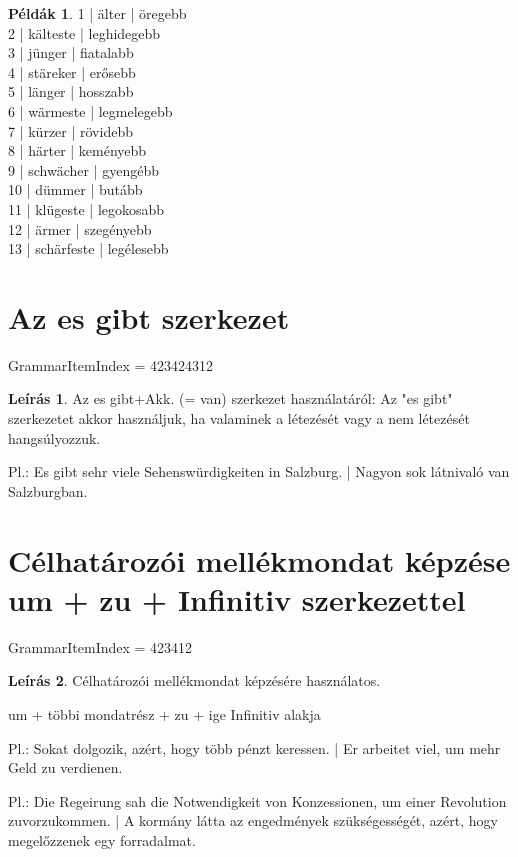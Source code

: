 \documentclass{article}
\theoremstyle{definition}
\newtheorem*{exmp}{Példák}
\newtheorem*{desc}{Leírás}
\begin{document}
\begin{exmp}
1 | älter | öregebb\\
2 | kälteste | leghidegebb\\
3 | jünger | fiatalabb\\
4 | stäreker | erősebb\\
5 | länger | hosszabb\\
6 | wärmeste | legmelegebb\\
7 | kürzer | rövidebb\\
8 | härter | keményebb\\
9 | schwächer | gyengébb\\
10 | dümmer | butább\\
11 | klügeste | legokosabb\\
12 | ärmer | szegényebb\\
13 | schärfeste | legélesebb\\
\end{exmp}

\section{Az es gibt szerkezet}

GrammarItemIndex = 423424312

\begin{desc}
Az es gibt+Akk. (= van) szerkezet használatáról: Az "es gibt" szerkezetet akkor használjuk, ha valaminek a létezését vagy a nem létezését hangsúlyozzuk.

Pl.: Es gibt sehr viele Sehenswürdigkeiten in Salzburg. | Nagyon sok látnivaló van Salzburgban.
\end{desc}

\section{Célhatározói mellékmondat képzése um + zu + Infinitiv szerkezettel}

GrammarItemIndex = 423412

\begin{desc}
Célhatározói mellékmondat képzésére használatos.

um + többi mondatrész + zu + ige Infinitiv alakja

Pl.: Sokat dolgozik, azért, hogy több pénzt keressen. | Er arbeitet viel, um mehr Geld zu verdienen.

Pl.: Die Regeirung sah die Notwendigkeit von Konzessionen, um einer Revolution zuvorzukommen. | A kormány látta az engedmények szükségességét, azért, hogy megelőzzenek egy forradalmat.
\end{desc}
\end{document}
